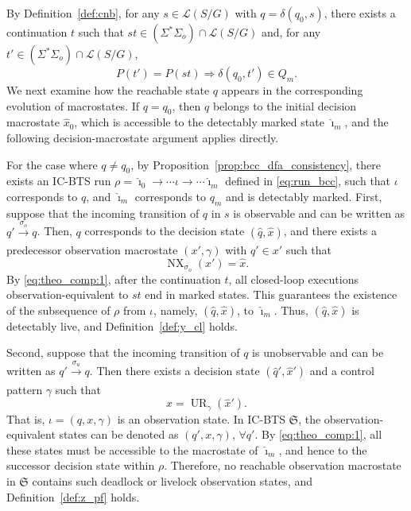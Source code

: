 \documentclass[twocolumn]{autart}
\def \UR{\operatorname{UR}}
\def \NX{\operatorname{NX}}
\begin{document}
\begin{pf}
By Definition~\ref{def:cnb}, for any $s \in \mathcal{L}(S / G)$ with $q = \delta(q_0, s)$, there exists a continuation $t$ such that $st \in (\Sigma^*\Sigma_o) \cap \mathcal{L}(S / G)$ and, for any $t' \in (\Sigma^*\Sigma_o) \cap \mathcal{L}(S / G)$,
\begin{equation}\label{eq:theo_comp:1}
    P(t') = P(st) \Rightarrow \delta(q_0, t') \in Q_m.
\end{equation}
We next examine how the reachable state $q$ appears in the corresponding evolution of macrostates.
If $q = q_0$, then $q$ belongs to the initial decision macrostate $\hat{x}_{0}$, which is accessible to the detectably marked state $\hat{\imath}_m$, and the following decision-macrostate argument applies directly.



For the case where $q \neq q_0$, by Proposition~\ref{prop:bcc_dfa_consistency}, there exists an IC-BTS run
$\rho = \hat{\imath}_0 \xrightarrow{} \cdots \iota \xrightarrow{} \cdots \hat{\imath}_m$ defined in \eqref{eq:run_bcc}, such that $\iota$ corresponds to $q$, and $\hat{\imath}_m$ corresponds to $q_m$ and is detectably marked.
First, suppose that the incoming transition of $q$ in $s$ is observable and can be written as $q' \xrightarrow[]{\sigma_o} q$.
Then, $q$ corresponds to the decision state $(\hat{q}, \hat{x})$, and there exists a predecessor observation macrostate $(x', \gamma)$ with $q' \in x'$ such that
$$
\NX_{\sigma_o}(x') = \hat{x}.
$$
By \eqref{eq:theo_comp:1}, after the continuation $t$, all closed-loop executions observation-equivalent to $st$ end in marked states.
This guarantees the existence of the subsequence of $\rho$ from $\iota$, namely, $(\hat{q}, \hat{x})$, to $\hat{\imath}_m$.
Thus, $(\hat{q}, \hat{x})$ is detectably live, and Definition~\ref{def:y_cl} holds.

Second, suppose that the incoming transition of $q$ is unobservable and can be written as $q' \xrightarrow[]{\sigma_{u}} q$. Then there exists a decision state $(\hat{q}', \hat{x}')$ and a control pattern $\gamma$ such that
$$
x = \UR_{\gamma}(\hat{x}').
$$
That is, $\iota = (q, x, \gamma)$ is an observation state.
In IC-BTS $\mathfrak{S}$, the observation-equivalent states can be denoted as $(q', x, \gamma)$, $\forall q'$.
By \eqref{eq:theo_comp:1}, all these states must be accessible to the macrostate of $\hat{\imath}_m$, and hence to the successor decision state within $\rho$.
Therefore, no reachable observation macrostate in $\mathfrak{S}$ contains such deadlock or livelock observation states, and Definition~\ref{def:z_pf} holds.


\end{pf}
\end{document}

